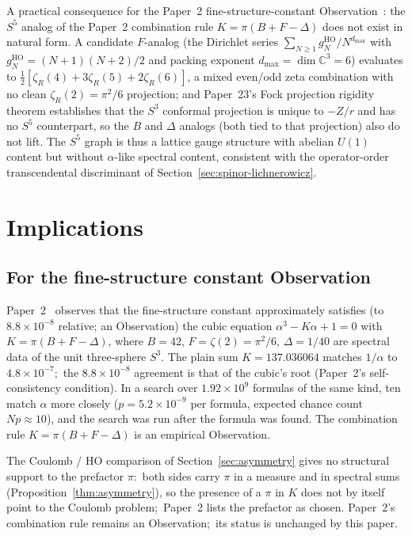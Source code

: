 \documentclass[twocolumn,pra,amsmath,amssymb,superscriptaddress]{revtex4-2}
\begin{document}
A practical consequence for the Paper~2 fine-structure-constant
Observation~\cite{paper2_alpha}: the $S^5$ analog of the Paper~2
combination rule $K = \pi(B + F - \Delta)$ does not exist in
natural form.  A candidate $F$-analog (the Dirichlet series
$\sum_{N\geq 1} g_N^{\mathrm{HO}} / N^{d_{\max}}$ with
$g_N^{\mathrm{HO}} = (N+1)(N+2)/2$ and packing exponent
$d_{\max} = \dim\mathbb{C}^3 = 6$) evaluates to
$\tfrac{1}{2}[\zeta_R(4) + 3\zeta_R(5) + 2\zeta_R(6)]$, a mixed
even/odd zeta combination with no clean $\zeta_R(2) = \pi^2/6$
projection; and Paper~23's Fock projection rigidity theorem
establishes that the $S^3$ conformal projection is unique to
$-Z/r$ and has no $S^5$ counterpart, so the $B$ and $\Delta$ analogs
(both tied to that projection) also do not lift.  The $S^5$ graph is thus a lattice gauge structure with
abelian $U(1)$ content but without $\alpha$-like spectral content,
consistent with the operator-order transcendental discriminant of
Section~\ref{sec:spinor-lichnerowicz}.  

\section{Implications}
\label{sec:imp}

\subsection{For the fine-structure constant Observation}
\label{sec:alpha}

Paper~2~\cite{paper2_alpha} observes that the fine-structure
constant approximately satisfies (to $8.8\times10^{-8}$ relative; an
Observation) the cubic equation $\alpha^3 - K \alpha + 1 = 0$
with $K = \pi (B + F - \Delta)$, where $B = 42$, $F = \zeta(2) =
\pi^2/6$, $\Delta = 1/40$ are spectral data of the unit
three-sphere $S^3$.  The plain sum $K =
137.036064$ matches $1/\alpha$ to $4.8 \times 10^{-7}$;\ the
$8.8\times10^{-8}$ agreement is that of the cubic's root (Paper~2's
self-consistency condition).  In a search over $1.92\times10^{9}$ formulas
of the same kind, ten match $\alpha$ more closely
($p = 5.2 \times 10^{-9}$ per formula, expected chance count
$Np \approx 10$), and the search was run after the formula was
found.  The combination
rule $K = \pi(B + F - \Delta)$ is an empirical Observation.

The Coulomb / HO comparison of Section~\ref{sec:asymmetry} gives no
structural support to the prefactor $\pi$:\ both sides carry $\pi$ in
a measure and in spectral sums (Proposition~\ref{thm:asymmetry}), so
the presence of a $\pi$ in $K$ does not by itself point to the Coulomb
problem;\ Paper~2 lists the prefactor as chosen.
Paper~2's combination rule remains an Observation;\ its status is
unchanged by this paper.
\end{document}
